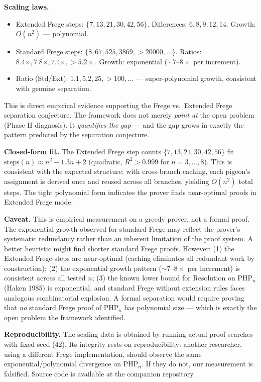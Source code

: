 \documentclass[11pt,a4paper]{article}
\newcommand{\PHP}{\mathrm{PHP}}
\begin{document}
\textbf{Scaling laws.}
\begin{itemize}[nosep]
    \item Extended Frege steps: $\{7, 13, 21, 30, 42, 56\}$. Differences: $6, 8, 9, 12, 14$. Growth: $O(n^2)$ --- polynomial.
    \item Standard Frege steps: $\{8, 67, 525, 3869, >20000, \ldots\}$. Ratios: $8.4\times, 7.8\times, 7.4\times, >5.2\times$. Growth: exponential ($\sim 7$--$8\times$ per increment).
    \item Ratio (Std/Ext): $1.1, 5.2, 25, >100, \ldots$ --- super-polynomial growth, consistent with genuine separation.
\end{itemize}

This is direct empirical evidence supporting the Frege vs.\ Extended Frege separation conjecture. The framework does not merely \emph{point at} the open problem (Phase II diagnosis). It \emph{quantifies the gap} --- and the gap grows in exactly the pattern predicted by the separation conjecture.

\textbf{Closed-form fit.} The Extended Frege step counts $\{7, 13, 21, 30, 42, 56\}$ fit $\mathrm{steps}(n) \approx n^2 - 1.3n + 2$ (quadratic, $R^2 > 0.999$ for $n = 3, \ldots, 8$). This is consistent with the expected structure: with cross-branch caching, each pigeon's assignment is derived once and reused across all branches, yielding $O(n^2)$ total steps. The tight polynomial form indicates the prover finds near-optimal proofs in Extended Frege mode.

\textbf{Caveat.} This is empirical measurement on a greedy prover, not a formal proof. The exponential growth observed for standard Frege may reflect the prover's systematic redundancy rather than an inherent limitation of the proof system. A better heuristic might find shorter standard Frege proofs. However: (1) the Extended Frege steps are near-optimal (caching eliminates all redundant work by construction); (2) the exponential growth pattern ($\sim 7$--$8\times$ per increment) is consistent across all tested $n$; (3) the known lower bound for Resolution on $\PHP_n$ (Haken 1985) is exponential, and standard Frege without extension rules faces analogous combinatorial explosion. A formal separation would require proving that \emph{no} standard Frege proof of $\PHP_n$ has polynomial size --- which is exactly the open problem the framework identified.

\textbf{Reproducibility.} The scaling data is obtained by running actual proof searches with fixed seed (42). Its integrity rests on reproducibility: another researcher, using a different Frege implementation, should observe the same exponential/polynomial divergence on $\PHP_n$. If they do not, our measurement is falsified. Source code is available at the companion repository.
\end{document}
